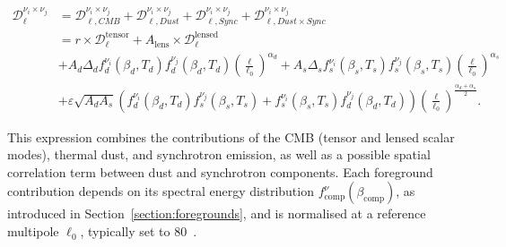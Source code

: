\documentclass[../../thesis.tex]{subfiles}
\begin{document}
\begin{equation}
    \begin{split}
        \mathcal{D}_{\ell}^{\nu_i \times \nu_j} &= \mathcal{D}_{\ell, CMB}^{\nu_i \times \nu_j} + \mathcal{D}_{\ell, Dust}^{\nu_i \times \nu_j} + \mathcal{D}_{\ell, Sync}^{\nu_i \times \nu_j} + \mathcal{D}_{\ell, Dust\times Sync}^{\nu_i \times \nu_j} \\
        &= r \times \mathcal{D}_{\ell}^{\text{tensor}} + A_{\mathrm{lens}} \times \mathcal{D}_{\ell}^{\text{lensed}} \\
        &+ A_d \Delta_d f_d^{\nu_i}(\beta_d, T_d) f_d^{\nu_j}(\beta_d, T_d) \left( \frac{\ell}{\ell_0} \right)^{\alpha_d} + A_s \Delta_s f_s^{\nu_i}(\beta_s, T_s) f_s^{\nu_j}(\beta_s, T_s) \left( \frac{\ell}{\ell_0} \right)^{\alpha_s} \\
        &+ \varepsilon \sqrt{A_d A_s} \left( f_d^{\nu_i}(\beta_d, T_d) f_s^{\nu_j}(\beta_s, T_s) + f_s^{\nu_i}(\beta_s, T_s) f_d^{\nu_j}(\beta_d, T_d)\right) \left( \frac{\ell}{\ell_0} \right)^{\frac{\alpha_d + \alpha_s}{2}}.
    \end{split}
\label{eq:xspec_model}
\end{equation}

This expression combines the contributions of the CMB (tensor and lensed scalar modes), thermal dust, and synchrotron emission, as well as a possible spatial correlation term between dust and synchrotron components. Each foreground contribution depends on its spectral energy distribution $f_{\mathrm{comp}}^{\nu}(\beta_{\mathrm{comp}})$, as introduced in Section~\ref{section:foregrounds}, and is normalised at a reference multipole $\ell_0$, typically set to $80$~\cite{Krachmalnicoff_2016}.
\end{document}
